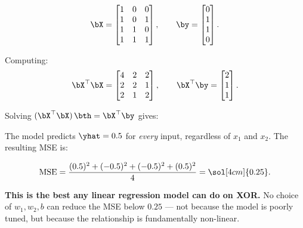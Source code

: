 \documentclass[12pt, a4paper]{article}
\begin{document}
\[
  \bX =
  \begin{bmatrix} 1 & 0 & 0 \\ 1 & 0 & 1 \\ 1 & 1 & 0 \\ 1 & 1 & 1 \end{bmatrix},
  \qquad
  \by =
  \begin{bmatrix} 0 \\ 1 \\ 1 \\ 0 \end{bmatrix}.
\]

Computing:
\[
  \bX^{\top}\bX =
  \begin{bmatrix} 4 & 2 & 2 \\ 2 & 2 & 1 \\ 2 & 1 & 2 \end{bmatrix},
  \qquad
  \bX^{\top}\by =
  \begin{bmatrix} 2 \\ 1 \\ 1 \end{bmatrix}.
\]

Solving $(\bX^{\top}\bX)\,\bth = \bX^{\top}\by$ gives:


The model predicts $\yhat = 0.5$ for \emph{every} input, regardless of $x_1$
and $x_2$.  The resulting MSE is:

\[
  \mathrm{MSE}
  = \frac{(0.5)^2 + (-0.5)^2 + (-0.5)^2 + (0.5)^2}{4}
  = \sol[4cm]{0.25}.
\]

\begin{warnbox}
  \textbf{This is the best any linear regression model can do on XOR.}
  No choice of $w_1, w_2, b$ can reduce the MSE below $0.25$ — not because
  the model is poorly tuned, but because the relationship is fundamentally
  non-linear.
\end{warnbox}

\end{document}
